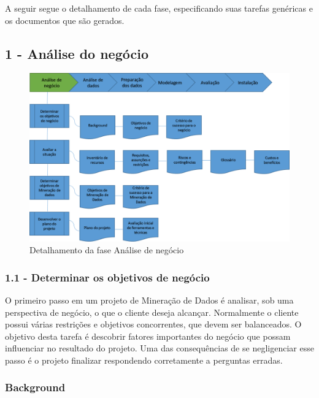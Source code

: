 A seguir segue o detalhamento de cada fase, especificando suas tarefas genéricas e os documentos que são gerados.

\newpage

\subsection*{1 - Análise do negócio}


\begin{figure}[H]
	\includegraphics[scale=0.8]{img/CRISP-DM-Analise-de-negocio.png}
	\caption{Detalhamento da fase Análise de negócio}
	\label{img:CRISP-DM-analise-de-negocio}
\end{figure}


\subsubsection*{\textbf{1.1 - Determinar os objetivos de negócio}}

O primeiro passo em um projeto de Mineração de Dados é analisar, sob uma perspectiva de negócio, o que o cliente deseja alcançar. Normalmente o cliente possui várias restrições e objetivos concorrentes, que devem ser balanceados. O objetivo desta tarefa é descobrir fatores importantes do negócio que possam influenciar no resultado do projeto. Uma das consequências de se negligenciar esse passo é o projeto finalizar respondendo corretamente a perguntas erradas.

\subsubsection*{Background}

